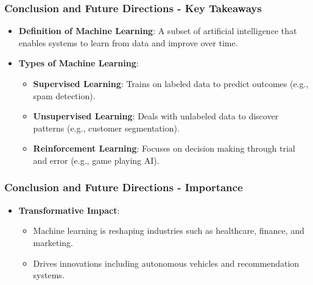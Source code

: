 \documentclass{beamer}
\begin{document}
\begin{frame}[fragile]
    \frametitle{Conclusion and Future Directions - Key Takeaways}
    \begin{itemize}
        \item \textbf{Definition of Machine Learning}: A subset of artificial intelligence that enables systems to learn from data and improve over time.
        \item \textbf{Types of Machine Learning}:
        \begin{itemize}
            \item \textbf{Supervised Learning}: Trains on labeled data to predict outcomes (e.g., spam detection).
            \item \textbf{Unsupervised Learning}: Deals with unlabeled data to discover patterns (e.g., customer segmentation).
            \item \textbf{Reinforcement Learning}: Focuses on decision making through trial and error (e.g., game playing AI).
        \end{itemize}
    \end{itemize}
\end{frame}

\begin{frame}[fragile]
    \frametitle{Conclusion and Future Directions - Importance}
    \begin{itemize}
        \item \textbf{Transformative Impact}:
        \begin{itemize}
            \item Machine learning is reshaping industries such as healthcare, finance, and marketing.
            \item Drives innovations including autonomous vehicles and recommendation systems.
        \end{itemize}
    \end{itemize}
\end{frame}
\end{document}
